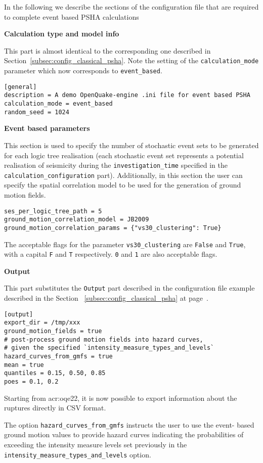 In the following we describe the sections of the configuration file that are
required to complete event based PSHA calculations


\textbf{Calculation type and model info}

This part is almost identical to the corresponding one described in
Section~\ref{subsec:config_classical_psha}. Note the setting of the
\texttt{calculation\_mode} parameter which now corresponds to
\texttt{event\_based}.

\begin{verbatim}
[general]
description = A demo OpenQuake-engine .ini file for event based PSHA
calculation_mode = event_based
random_seed = 1024
\end{verbatim}

\textbf{Event based parameters}

This section is used to specify the number of stochastic event sets to be
generated for each logic tree realisation (each stochastic event set
represents a potential realisation of seismicity during the
\texttt{investigation\_time} specified in the
\texttt{calculation\_configuration} part). Additionally, in this section the
user can specify the spatial correlation model to be used for the generation
of ground motion fields.

\begin{verbatim}
ses_per_logic_tree_path = 5
ground_motion_correlation_model = JB2009
ground_motion_correlation_params = {"vs30_clustering": True}
\end{verbatim}

The acceptable flags for the parameter \verb+vs30_clustering+ are \verb+False+
and \verb+True+, with a capital \verb+F+ and \verb+T+ respectively. \verb+0+
and \verb+1+ are also acceptable flags.

\textbf{Output}

This part substitutes the \texttt{Output} part described in  the configuration
file example described in the Section~ \ref{subsec:config_classical_psha} at
page~\pageref{subsec:config_classical_psha}.

\begin{verbatim}
[output]
export_dir = /tmp/xxx
ground_motion_fields = true
# post-process ground motion fields into hazard curves,
# given the specified `intensity_measure_types_and_levels`
hazard_curves_from_gmfs = true
mean = true
quantiles = 0.15, 0.50, 0.85
poes = 0.1, 0.2
\end{verbatim}

Starting from \glsdesc{acr:oqe22}, it is now possible to export information
about the ruptures directly in CSV format.

The option \verb=hazard_curves_from_gmfs= instructs the user to use the event-
based ground motion values to provide hazard curves indicating the
probabilities of exceeding the intensity measure levels set previously in the
\verb=intensity_measure_types_and_levels= option.
